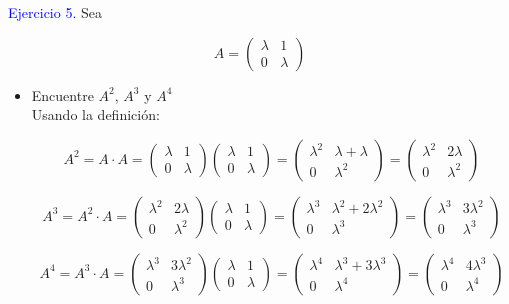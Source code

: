 \textcolor{blue}{Ejercicio 5.} Sea

$$A= \begin{pmatrix}
\lambda & 1\\
0 & \lambda
\end{pmatrix}$$

\begin{itemize}
    \item Encuentre $A^2$, $A^3$ y $A^4$\\
    
    Usando la definición: 
    
    $$A^2= A \cdot A= \begin{pmatrix}
    \lambda & 1\\
    0 & \lambda
    \end{pmatrix}
    \begin{pmatrix}
    \lambda & 1\\
    0 & \lambda
    \end{pmatrix}=
    \begin{pmatrix}
    \lambda^2 & \lambda + \lambda \\
    0 & \lambda^2
    \end{pmatrix}= 
    \begin{pmatrix}
    \lambda^2 & 2 \lambda \\
    0 & \lambda^2
    \end{pmatrix}$$
    
    $$A^3= A^2 \cdot A= \begin{pmatrix}
    \lambda^2 & 2 \lambda \\
    0 & \lambda^2
    \end{pmatrix}
    \begin{pmatrix}
    \lambda & 1\\
    0 & \lambda
    \end{pmatrix}=
    \begin{pmatrix}
    \lambda^3 & \lambda^2 + 2 \lambda^2 \\
    0 & \lambda^3
    \end{pmatrix}= 
    \begin{pmatrix}
    \lambda^3 & 3 \lambda^2 \\
    0 & \lambda^3
    \end{pmatrix}$$
    
    $$A^4= A^3 \cdot A= \begin{pmatrix}
    \lambda^3 & 3 \lambda^2 \\
    0 & \lambda^3
    \end{pmatrix}
    \begin{pmatrix}
    \lambda & 1\\
    0 & \lambda
    \end{pmatrix}=
    \begin{pmatrix}
    \lambda^4 & \lambda^3 + 3 \lambda^3 \\
    0 & \lambda^4
    \end{pmatrix}= 
    \begin{pmatrix}
    \lambda^4 & 4 \lambda^3 \\
    0 & \lambda^4
    \end{pmatrix}$$
    

\end{itemize}
